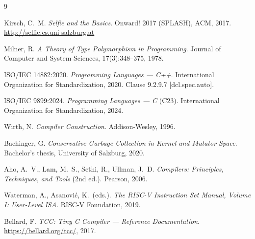 \documentclass[a4paper,11pt]{article}
\begin{document}
\footnotesize
\begin{thebibliography}{9}
\setlength{\itemsep}{1pt}
\setlength{\parsep}{0pt}

  Kirsch, C.\ M.
  \textit{Selfie and the Basics}.
  Onward! 2017 (SPLASH), ACM, 2017.
  \url{http://selfie.cs.uni-salzburg.at}

  Milner, R.
  \textit{A Theory of Type Polymorphism in Programming}.
  Journal of Computer and System Sciences, 17(3):348--375, 1978.

  ISO/IEC 14882:2020.
  \textit{Programming Languages --- C++}.
  International Organization for Standardization, 2020. Clause 9.2.9.7 [dcl.spec.auto].

  ISO/IEC 9899:2024.
  \textit{Programming Languages --- C} (C23).
  International Organization for Standardization, 2024.

  Wirth, N.
  \textit{Compiler Construction}.
  Addison-Wesley, 1996.

  Bachinger, G.
  \textit{Conservative Garbage Collection in Kernel and Mutator Space}.
  Bachelor's thesis, University of Salzburg, 2020.

  Aho, A.\ V., Lam, M.\ S., Sethi, R., Ullman, J.\ D.
  \textit{Compilers: Principles, Techniques, and Tools} (2nd ed.).
  Pearson, 2006.

  Waterman, A., Asanovi\'{c}, K.\ (eds.).
  \textit{The RISC-V Instruction Set Manual, Volume I: User-Level ISA}.
  RISC-V Foundation, 2019.

  Bellard, F.
  \textit{TCC: Tiny C Compiler --- Reference Documentation}.
  \url{https://bellard.org/tcc/}, 2017.

\end{thebibliography}
\end{document}
